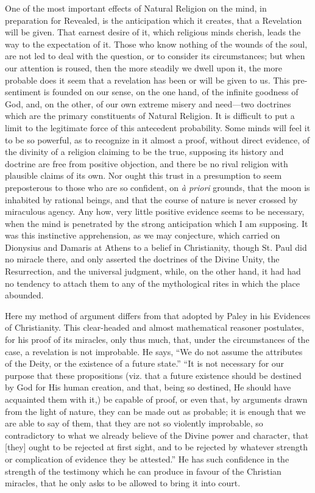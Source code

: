 One of the most important effects of Natural Religion on the mind,
in preparation for Revealed, is the anticipation which it
creates, that a Revelation will be given. That earnest desire of it,
which religious minds cherish, leads the way to the expectation of it.
Those who know nothing of the wounds of the soul, are not led to deal
with the question, or to consider its circumstances; but when our
attention is roused, then the more steadily we dwell upon it, the more
probable does it seem that a revelation has been or will be given to
us. This pre-sentiment is founded on our sense, on the one hand, of
the infinite goodness of God, and, on the other, of our own extreme
misery and need—two doctrines which are the primary constituents of
Natural Religion. It is difficult to put a limit to the legitimate
force of this antecedent probability. Some minds will feel it to be so
powerful, as to recognize in it almost a proof, without direct
evidence, of the divinity of a religion claiming to be the true,
supposing its history and doctrine are free from positive objection,
and there be no rival religion with plausible claims of its own. Nor
ought this trust in a presumption to seem preposterous to those who
are so confident, on \emph{à priori} grounds, that the moon is
inhabited by rational beings, and that the course of nature is never
crossed by miraculous agency. Any how, very little positive evidence
seems to be necessary, when the mind is penetrated by the strong
anticipation which I am supposing. It was this instinctive
apprehension, as we may conjecture, which carried on Dionysius and
Damaris at Athens to a belief in Christianity, though St. Paul did no
miracle there, and only asserted the doctrines of the Divine Unity,
the Resurrection, and the universal judgment, while, on the other
hand, it had had no tendency to attach them to any of the
mythological rites in which the place abounded.

Here my method of argument differs from that adopted by Paley in
his Evidences of Christianity. This clear-headed and almost
mathematical reasoner postulates, for his proof of its miracles, only
thus much, that, under the circumstances of the case, a revelation is
not improbable. He says, ``We do not assume the attributes of the
Deity, or the existence of a future state.'' ``It is not
necessary for our purpose that these propositions (viz. that a future
existence should be destined by God for His human creation, and that,
being so destined, He should have acquainted them with it,) be capable
of proof, or even that, by arguments drawn from the light of nature,
they can be made out as probable; it is enough that we are able to say
of them, that they are not so violently improbable, so contradictory
to what we already believe of the Divine power and character, that
[they] ought to be rejected at first sight, and to be rejected by
whatever strength or complication of evidence they be attested.''
He has such confidence in the strength of the testimony which he can
produce in favour of the Christian miracles, that he only asks to be
allowed to bring it into court.

